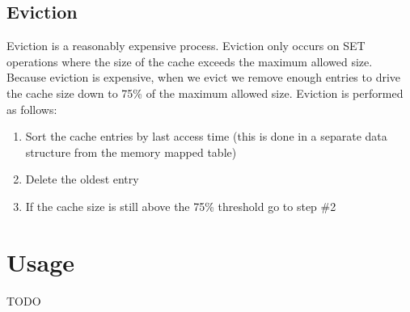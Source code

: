 \documentclass{article}
\begin{document}
\subsection{Eviction}
Eviction is a reasonably expensive process. Eviction only occurs on SET operations where the size of the cache exceeds the maximum allowed size. Because eviction is expensive, when we evict we remove enough entries to drive the cache size down to 75\% of the maximum allowed size. Eviction is performed as follows:
\begin{enumerate}
\item Sort the cache entries by last access time (this is done in a separate data structure from the memory mapped table)
\item Delete the oldest entry
\item If the cache size is still above the 75\% threshold go to step \#2
\end{enumerate}


\section{Usage}
TODO
\end{document}
